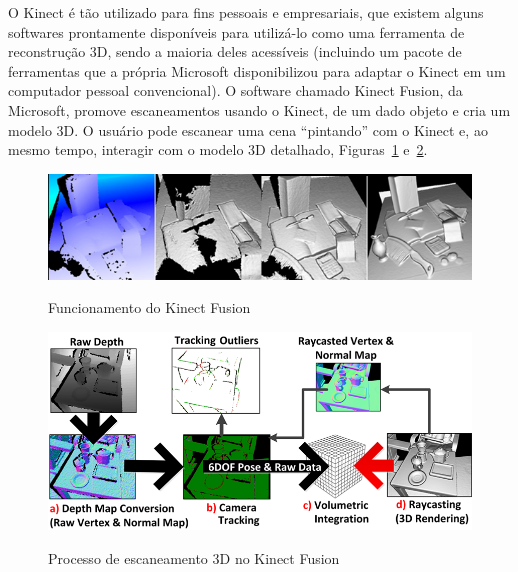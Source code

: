 O Kinect é tão utilizado para fins pessoais e empresariais, que existem alguns
softwares prontamente disponíveis para utilizá-lo como uma ferramenta de
reconstrução 3D, sendo a maioria deles acessíveis (incluindo um pacote de ferramentas que a própria
Microsoft disponibilizou para adaptar o Kinect em um computador pessoal convencional).
O software chamado Kinect Fusion, da Microsoft, promove escaneamentos usando o Kinect, de
um dado objeto e cria um modelo 3D.  O usuário pode escanear uma cena
``pintando'' com o Kinect e, ao mesmo tempo, interagir com o modelo 3D
detalhado, Figuras~\ref{fig:KinectFusionPipe} e~\ref{fig:KinectFusionPipe2}.

\clearpage

\begin{figure}[!h]
	\centering
	\caption{Funcionamento do Kinect Fusion}
		\includegraphics[width=1\linewidth]{figs/reconstrucaoKinectFusion.png}
   \label{fig:KinectFusionPipe}
\end{figure}

\begin{figure}[!h]
	\centering
	\caption{Processo de escaneamento 3D no Kinect Fusion}
	\includegraphics[width=1\linewidth]{figs/kinectfusionpipeline.png}	
   \label{fig:KinectFusionPipe2}
\end{figure}

